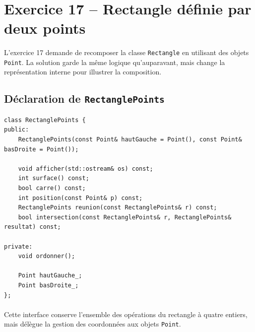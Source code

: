 \documentclass[12pt,a4paper]{article}
\begin{document}
\section{Exercice 17 – Rectangle définie par deux points}
\paragraph{}
L'exercice 17 demande de recomposer la classe \texttt{Rectangle} en utilisant des objets \texttt{Point}. La solution garde la même logique qu'auparavant, mais change la représentation interne pour illustrer la composition.

\subsection{Déclaration de \texttt{RectanglePoints}}
\begin{lstlisting}[style=cppstyle]
class RectanglePoints {
public:
    RectanglePoints(const Point& hautGauche = Point(), const Point& basDroite = Point());

    void afficher(std::ostream& os) const;
    int surface() const;
    bool carre() const;
    int position(const Point& p) const;
    RectanglePoints reunion(const RectanglePoints& r) const;
    bool intersection(const RectanglePoints& r, RectanglePoints& resultat) const;

private:
    void ordonner();

    Point hautGauche_;
    Point basDroite_;
};
\end{lstlisting}

\paragraph{}
Cette interface conserve l'ensemble des opérations du rectangle à quatre entiers, mais délègue la gestion des coordonnées aux objets \texttt{Point}.
\end{document}
